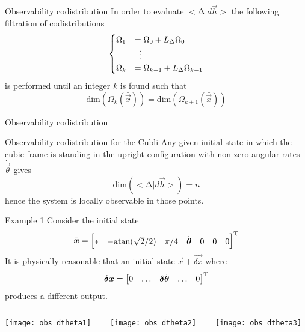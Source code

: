 \begin{frame}{Observability codistribution \theory}
In order to evaluate $< \mathrm{\Delta}|d\vec{h} >$
 the following filtration of codistributions
\[
\begin{cases}
\Omega_1 &= \Omega_0 + L_\Delta \Omega_0\\
&\vdotswithin{=} \\
\Omega_k &= \Omega_{k-1} + L_\Delta \Omega_{k-1}
\end{cases}
\]
is performed until an integer $k$ is found such that
\[
\mathrm{dim}(\Omega_{k}(\bar{\vec{x}})) = \mathrm{dim}(\Omega_{k + 1}(\bar{\vec{x}}))
\]
\end{frame}

\begin{frame}{Observability codistribution \cubli}
  \begin{exampleblock}{Observability codistribution for the Cubli}
    Any given initial state in which the cubic frame is standing in the upright
    configuration with \alert{non zero angular rates $\dot{\vec{\theta}}$} gives
    \[
    \mathrm{dim} (<\mathrm{\Delta} | d\vec{h}>) = n
    \]
    hence the system \alert{is locally observable} in those points.
  \end{exampleblock}
\end{frame}

\begin{frame}{Example 1 \cubli}
  Consider the initial state 
  \[
  \bar{\boldsymbol{x}} = 
  \begin{bmatrix}
    * & -\mathrm{atan}(\sqrt{2}/2) & \pi/4 & \bar{\dot{\boldsymbol{\theta}}} & 0 & 0 & 0
  \end{bmatrix}^{\mathrm{T}}
  \]
  It is physically reasonable that an initial state $\bar{\vec{x}} + \vec{\delta x}$ where
  \[
  \boldsymbol{\delta x} = \begin{bmatrix}
    0 & \hdots & \boldsymbol{\delta}\dot{\boldsymbol{\theta}} & \hdots & 0
  \end{bmatrix}^{\mathrm{T}}
  \]
  produces a different output.
  \begin{columns}
    \begin{column}{0.37\textwidth}
      \texttt{[image: obs\_dtheta1]}
    \end{column}
    \begin{column}{0.37\textwidth}
      \texttt{[image: obs\_dtheta2]}
    \end{column}
    \begin{column}{0.37\textwidth}
      \texttt{[image: obs\_dtheta3]}
    \end{column}
  \end{columns}
\end{frame}


